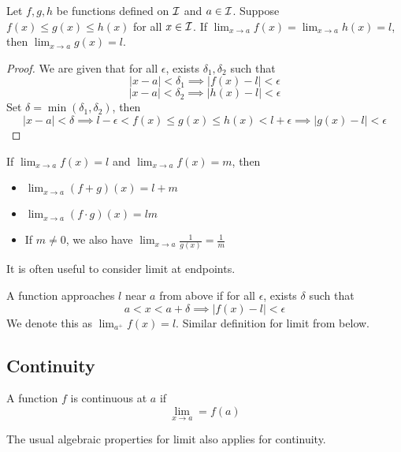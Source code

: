 \documentclass[11pt]{article}
\begin{document}
\begin{theorem}
  Let \(f,g,h\) be functions defined on \(\cal{I}\) and \(a\in\cal{I}\). Suppose \(f(x)\leq g(x)\leq h(x)\) for all \(x\in\cal{I}\). If \(\lim_{x\to a}f(x)=\lim_{x\to a}h(x)=l\), then \(\lim_{x\to a}g(x)=l\).
\end{theorem}
\begin{proof}
  We are given that for all \(\epsilon\), exists \(\delta_1,\delta_2\) such that 
  \[|x-a|<\delta_1\implies|f(x)-l|<\epsilon\]
  \[|x-a|<\delta_2\implies|h(x)-l|<\epsilon\]
  Set \(\delta=\min(\delta_1,\delta_2)\), then
  \[|x-a|<\delta\implies l-\epsilon<f(x)\leq g(x)\leq h(x)<l+\epsilon\implies |g(x)-l|<\epsilon\]
\end{proof}

\begin{proposition}
  If \(\lim_{x\to a}f(x) = l\) and \(\lim_{x\to a}f(x)=m\), then
  \begin{itemize}
    \item \(\lim_{x\to a}(f+g)(x)=l+m\)
    \item \(\lim_{x\to a}(f\cdot g)(x)=lm\)
    \item If \(m\neq 0\), we also have \(\lim_{x\to a}\frac{1}{g(x)}=\frac{1}{m}\)
  \end{itemize}
\end{proposition}

It is often useful to consider limit at endpoints. 
\begin{definition}
  A function approaches \(l\) near \(a\) from above if for all \(\epsilon\), exists \(\delta\) such that
  \[a<x<a+\delta \implies |f(x)-l|<\epsilon\]
  We denote this as \(\lim_{a^+}f(x)=l\). Similar definition for limit from below.
\end{definition}

\begin{example}
  
\end{example}

\subsection{Continuity}
\begin{definition}[Continuous]
  A function \(f\) is continuous at \(a\) if
  \[\lim_{x\to a}=f(a)\]
\end{definition}

The usual algebraic properties for limit also applies for continuity.
\end{document}
